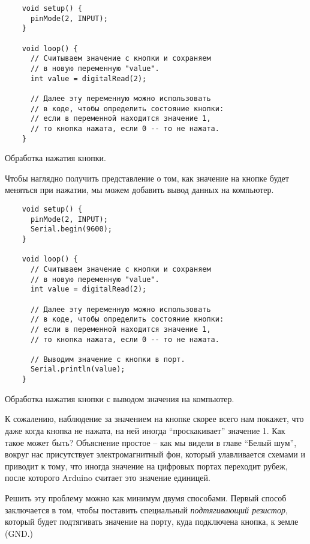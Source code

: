 \documentclass[../sparc.tex]{subfiles}
\begin{document}
\begin{listing}[H]
  \begin{verbatim}
    void setup() {
      pinMode(2, INPUT);
    }

    void loop() {
      // Считываем значение с кнопки и сохраняем
      // в новую переменную "value".
      int value = digitalRead(2);

      // Далее эту переменную можно использовать
      // в коде, чтобы определить состояние кнопки:
      // если в переменной находится значение 1,
      // то кнопка нажата, если 0 -- то не нажата.
    }
  \end{verbatim}
  \caption{Обработка нажатия кнопки.}
  \label{listing:button-00}
\end{listing}

Чтобы наглядно получить представление о том, как значение на кнопке будет
меняться при нажатии, мы можем добавить вывод данных на компьютер.

\begin{listing}[H]
  \begin{verbatim}
    void setup() {
      pinMode(2, INPUT);
      Serial.begin(9600);
    }

    void loop() {
      // Считываем значение с кнопки и сохраняем
      // в новую переменную "value".
      int value = digitalRead(2);

      // Далее эту переменную можно использовать
      // в коде, чтобы определить состояние кнопки:
      // если в переменной находится значение 1,
      // то кнопка нажата, если 0 -- то не нажата.

      // Выводим значение с кнопки в порт.
      Serial.println(value);
    }
  \end{verbatim}
  \caption{Обработка нажатия кнопки с выводом значения на компьютер.}
  \label{listing:button-01}
\end{listing}

К сожалению, наблюдение за значением на кнопке скорее всего нам покажет, что
даже когда кнопка не нажата, на ней иногда ``проскакивает'' значение 1.  Как
такое может быть?  Объяснение простое -- как мы видели в главе ``Белый шум'',
вокруг нас присутствует электромагнитный фон, который улавливается схемами и
приводит к тому, что иногда значение на цифровых портах переходит рубеж, после
которого Arduino считает это значение единицей.

Решить эту проблему можно как минимум двумя способами.  Первый способ
заключается в том, чтобы поставить специальный \emph{подтягивающий резистор},
который будет подтягивать значение на порту, куда подключена кнопка, к земле
(GND.)
\end{document}

